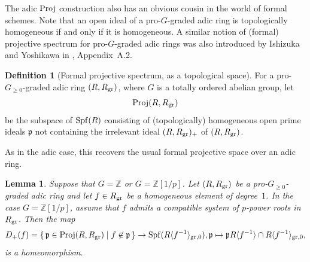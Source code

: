 \documentclass[12pt,twoside,a4paper]{article}
\newtheorem{lemma}[thm]{Lemma}
\theoremstyle{definition}
\newtheorem{mydef}[thm]{Definition}
\theoremstyle{remark}
\newcommand\gr{{\rm gr}}
\newcommand\Proj{{\rm Proj}}
\newcommand\Spf{{\rm Spf}}
\begin{document}
The adic $\Proj$ construction also has an obvious cousin in the world of formal schemes. Note that an open ideal of a pro-$G$-graded adic ring is topologically homogeneous if and only if it is homogeneous. A similar notion of (formal) projective spectrum for pro-$G$-graded adic rings was also introduced by Ishizuka and Yoshikawa in \cite{Ishizuka-Yoshikawa26}, Appendix~A.2.   
\begin{mydef}[Formal projective spectrum, as a topological space]\label{Formal Proj, part 1}For a pro-$G_{\geq0}$-graded adic ring $(R, R_{\gr})$, where $G$ is a totally ordered abelian group, let \begin{equation*}\Proj(R, R_{\gr})\end{equation*}be the subspace of $\Spf(R)$ consisting of (topologically) homogeneous open prime ideals $\mathfrak{p}$ not containing the irrelevant ideal $(R, R_{\gr})_{+}$ of $(R, R_{\gr})$.\end{mydef}
As in the adic case, this recovers the usual formal projective space over an adic ring.
\begin{lemma}\label{Gluing 0, formal case}Suppose that $G=\mathbb{Z}$ or $G=\mathbb{Z}[1/p]$. Let $(R, R_{\gr})$ be a pro-$G_{\geq0}$-graded adic ring and let $f\in R_{\gr}$ be a homogeneous element of degree~$1$. In the case $G=\mathbb{Z}[1/p]$, assume that $f$ admits a compatible system of $p$-power roots in $R_{\gr}$. Then the map \begin{equation*}D_{+}(f)=\{\, \mathfrak{p}\in \Proj(R, R_{\gr})\mid f\not\in \mathfrak{p}\,\}\to \Spf(R\langle f^{-1}\rangle_{\gr, 0}), \mathfrak{p}\mapsto \mathfrak{p}R\langle f^{-1}\rangle\cap R\langle f^{-1}\rangle_{\gr, 0},\end{equation*}is a homeomorphism.\end{lemma}
\end{document}
